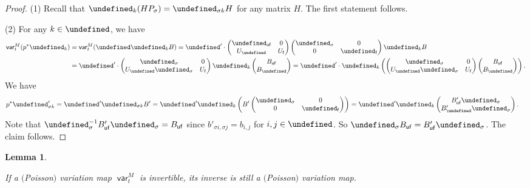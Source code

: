 \documentclass[10pt,a4paper]{amsart}
\newcommand{\opname}[1]{\operatorname{\mathsf{#1}}}
\newcommand{\var}{\opname{var}}
\newcommand{\fv}{\opname{f}}
\newcommand{\ufv}{\opname{uf}}
\let\Iufv\undefined
\let\Id\undefined
\let\col\undefined
\let\trans\undefined
\let\ee\undefined
\let\ff\undefined
\let\uff\undefined
\let\low\undefined
\newcommand{\Iufv}{I_{\ufv}}
\newcommand{\Id}{{\opname{Id}}}
\newcommand{\col}{\opname{col}}
\newcommand{\trans}{\opname{P}}
\newcommand{\ee}{\mathbf{e}}
\newcommand{\ff}{\mathbf{f}}
\newcommand{\uff}{\underline{\ff}}
\newcommand{\low}{\opname{\fv,\ufv}}
\numberwithin{equation}{section}
\newtheorem{Lemma}[Theorem]{Lemma}
\begin{document}
\begin{proof}

(1) Recall that $\col_{k}(HP_{\sigma})=\col_{\sigma k}H$ for any
matrix $H$. The first statement follows.

(2) For any $k\in\Iufv$, we have
\begin{align*}
\var_{t}^{M}(p^{*}\ee_{k}) & =\var_{t}^{M}(\uff\col_{k}B) =\uff'\cdot\begin{pmatrix}
\Id_{\ufv} & 0\\
U_{\low} & U_{\fv}
\end{pmatrix}\begin{pmatrix}
\trans_{\sigma} & 0\\
0 & \Id_{\fv}
\end{pmatrix}\col_{k}B\\
 & =\uff'\cdot\begin{pmatrix}
\trans_{\sigma} & 0\\
U_{\low}\trans_{\sigma} & U_{\fv}
\end{pmatrix}\col_{k}\begin{pmatrix}
B_{\ufv}\\
B_{\low}
\end{pmatrix} =\uff'\cdot\col_{k}\left(\begin{pmatrix}
\trans_{\sigma} & 0\\
U_{\low}\trans_{\sigma} & U_{\fv}
\end{pmatrix}\begin{pmatrix}
B_{\ufv}\\
B_{\low}
\end{pmatrix}\right).
\end{align*}
We have
\begin{align*}
p^{*}\ee_{\sigma k}' & =\uff'\col_{\sigma k}B' =\uff'\col_{k}\left(B'\begin{pmatrix}
\trans_{\sigma} & 0\\
0 & \Id_{\fv}
\end{pmatrix}\right) =\uff'\col_{k}\begin{pmatrix}
B'_{\ufv}\trans_{\sigma}\\
B'_{\low}\trans_{\sigma}
\end{pmatrix}.
\end{align*}
Note that $\trans_{\sigma}^{-1}B'_{\ufv}\trans_{\sigma}=B_{\ufv}$
since $b'_{\sigma i,\sigma j}=b_{i,j}$ for $i,j\in\Iufv$. So $\trans_{\sigma}B_{\ufv}=B'_{\ufv}\trans_{\sigma}$.
The claim follows.
\end{proof}

\begin{Lemma}\label{lem:inverse_M_variation}

If a $($Poisson$)$ variation map $\var_{t}^{M}$ is invertible, its inverse
is still a $($Poisson$)$ variation map.

\end{Lemma}
\end{document}
